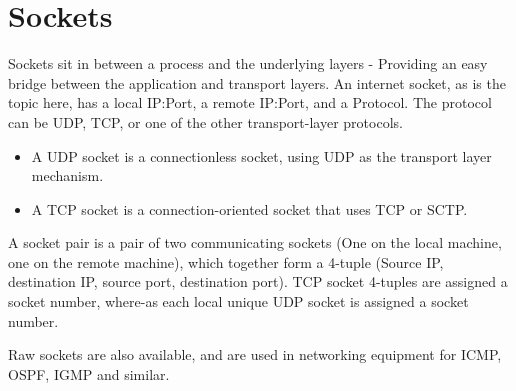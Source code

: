 \section{Sockets}
Sockets sit in between a process and the underlying layers - Providing an easy
bridge between the application and transport layers. An internet socket, as is
the topic here, has a local IP:Port, a remote IP:Port, and a Protocol. The protocol
can be UDP, TCP, or one of the other transport-layer protocols.

\begin{itemize}
    \item A UDP socket is a connectionless socket, using UDP as the transport layer mechanism.
    \item A TCP socket is a connection-oriented socket that uses TCP or SCTP.
\end{itemize}

A socket pair is a pair of two communicating sockets (One on the local machine,
one on the remote machine), which together form a 4-tuple (Source IP, destination IP,
source port, destination port). TCP socket 4-tuples are assigned a socket number,
where-as each local unique UDP socket is assigned a socket number.

Raw sockets are also available, and are used in networking equipment for ICMP,
OSPF, IGMP and similar.
